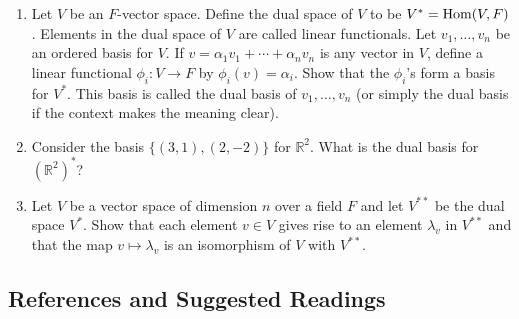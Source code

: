 {\begin{enumerate}
\begin{enumerate}
   \item
Let $V$ be an $F$-vector space.  Define the {\bfi dual
space\/} of $V$ 
to be $V^\ast = \operatorname{Hom}(V, F)$\label{notedual}. Elements in the dual space of $V$ are
called {\bfi linear functionals}.  Let $v_1,
\ldots, v_n$ be an ordered basis for $V$. If $v = \alpha_1 v_1 +
\cdots + \alpha_n v_n$ is any vector in $V$, define a linear
functional  $\phi_i : V \rightarrow F$ by $\phi_i (v) = \alpha_i$.
Show that the $\phi_i$'s form a basis for $V^\ast$.  This basis is
called the {\bfi dual basis\/} of $v_1, \ldots, v_n$ (or simply the dual
basis if the context makes the meaning clear).  
 

   \item
Consider the basis $\{ (3, 1), (2, -2) \}$ for ${\mathbb R}^2$. What is
the dual basis for $({\mathbb R}^2)^\ast$? 
 
   \item
Let $V$ be a vector space of dimension $n$ over a field $F$ and let
$V^{\ast \ast}$ be the dual space $V^\ast$.  Show that each element $v
\in V$ gives rise to an element $\lambda_v$ in $V^{\ast \ast}$ and
that the map $v \mapsto \lambda_v$ is an isomorphism of $V$ with
$V^{\ast \ast}$. 

\end{enumerate}
 

\end{enumerate}
}


 
\subsection*{References and Suggested Readings}  %
 

